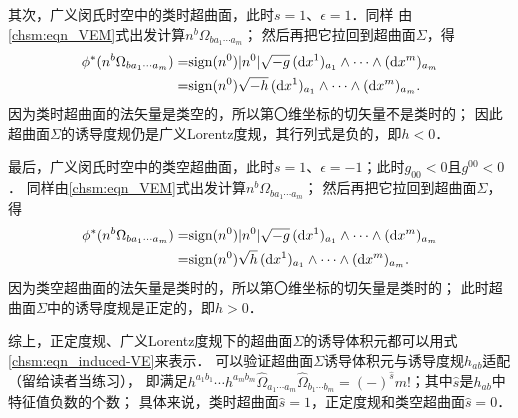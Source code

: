 其次，广义闵氏时空中的类时超曲面，此时$s=1$、$\epsilon=1$．同样
由\eqref{chsm:eqn_VEM}式出发计算$n^b \Omega_{b a_1 \cdots a_m}$；
然后再把它拉回到超曲面$\Sigma$，得 %
\begin{equation}\label{chsm:eqn_induced-VE-TLHS}
\begin{aligned}
    \phi^*( n^b \Omega_{b a_1 \cdots a_m})=& {\rm sign}(n^0) |n^0| \sqrt{-g}\,
    ({\rm d}x^1)_{a_1} \wedge \cdots \wedge({\rm d}x^m)_{a_m} \\
    =&{\rm sign}(n^0) \sqrt{-h}\, ({\rm d}x^1)_{a_1} \wedge \cdots \wedge({\rm d}x^m)_{a_m}.
\end{aligned}
\end{equation}
因为类时超曲面的法矢量是类空的，所以第〇维坐标的切矢量不是类时的；
因此超曲面$\Sigma$的诱导度规仍是广义Lorentz度规，其行列式是负的，即$h<0$．

最后，广义闵氏时空中的类空超曲面，此时$s=1$、$\epsilon=-1$；此时$g_{00}<0$且$g^{00}<0$．
同样由\eqref{chsm:eqn_VEM}式出发计算$n^b \Omega_{b a_1 \cdots a_m}$；
然后再把它拉回到超曲面$\Sigma$，得 %
\begin{equation}\label{chsm:eqn_induced-VE-SLHS}
\begin{aligned}
    \phi^*( n^b \Omega_{b a_1 \cdots a_m})=& {\rm sign}(n^0) |n^0| \sqrt{-g}\,
      ({\rm d}x^1)_{a_1} \wedge \cdots \wedge({\rm d}x^m)_{a_m} \\
    =&{\rm sign}(n^0)\sqrt{h}\, ({\rm d}x^1)_{a_1} \wedge \cdots \wedge({\rm d}x^m)_{a_m}.
\end{aligned}
\end{equation}
因为类空超曲面的法矢量是类时的，所以第〇维坐标的切矢量是类时的；
此时超曲面$\Sigma$中的诱导度规是正定的，即$h>0$．

综上，正定度规、广义Lorentz度规下的超曲面$\Sigma$的诱导体积元都可以用式\eqref{chsm:eqn_induced-VE}来表示．
可以验证超曲面$\Sigma$诱导体积元与诱导度规$h_{ab}$适配（留给读者当练习），
即满足$h^{a_1b_1}\cdots h^{a_{m}b_{m}} \hat{\Omega}_{a_1 \cdots a_{m}} \hat{\Omega}_{b_1 \cdots b_{m}}
= (-)^{\hat{s}} m!$；其中$\hat{s}$是$h_{ab}$中特征值负数的个数；
具体来说，类时超曲面$\hat{s}=1$，正定度规和类空超曲面$\hat{s}=0$．




